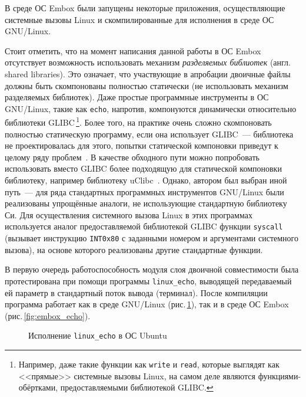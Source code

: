 
В среде ОС Embox были запущены некоторые приложения, осуществляющие системные вызовы Linux и скомпилированные для исполнения в среде ОС GNU/Linux.

Стоит отметить, что на момент написания данной работы в ОС Embox отсутствует возможность использовать механизм \textit{разделяемых библиотек} (англ. shared libraries). Это означает, что участвующие в апробации двоичные файлы должны быть скомпонованы полностью статически (не использовать механизм разделяемых библиотек). Даже простые программные инструменты в ОС GNU/Linux, такие как \texttt{echo}, напротив, компонуются динамически относительно библиотеки GLIBC\,\footnote{Например, даже такие функции как \texttt{write} и \texttt{read}, которые выглядят как <<прямые>> системные вызовы Linux, на самом деле являются функциями-обёртками, предоставляемыми библиотекой GLIBC.}. Более того, на практике очень сложно скомпоновать полностью статическую программу, если она использует GLIBC~--- библиотека не проектировалась для этого, попытки статической компоновки приведут к целому ряду проблем~\cite{glibc}. В качестве обходного пути можно попробовать использовать вместо GLIBC более подходящую для статической компоновки библиотеку, например библиотеку uClibc~\cite{uclibc}. Однако, автором был выбран иной путь~--- для ряда стандартных программных инструментов GNU/Linux были реализованы упрощённые аналоги, не использующие стандартную библиотеку Си. Для осуществления системного вызова Linux в этих программах используется аналог предоставляемой библиотекой GLIBC функции \texttt{syscall} (вызывает инструкцию \texttt{INT0x80} с заданными номером и аргументами системного вызова), на основе которого реализованы другие стандартные функции.

В первую очередь работоспособность модуля слоя двоичной совместимости была протестирована при помощи программы \texttt{linux\_echo}, выводящей передаваемый ей параметр в стандартный поток вывода (терминал). После компиляции программа работает как в среде GNU/Linux (рис.\,\ref{fig:linux_echo}), так и в среде ОС Embox (рис.\,\ref{fig:embox_echo}).

\begin{figure}[H]
\caption{Исполнение \texttt{linux\_echo} в ОС Ubuntu}
\label{fig:linux_echo}
\end{figure}


